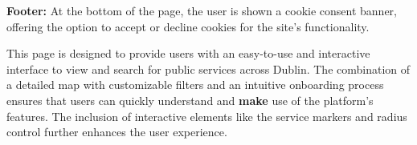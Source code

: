 \textbf{Footer:} At the bottom of the page, the user is shown a cookie consent banner, offering the option to accept or decline cookies for the site’s functionality.

This page is designed to provide users with an easy{-}to{-}use and interactive interface to view and search for public services across Dublin. The combination of a detailed map with customizable filters and an intuitive onboarding process ensures that users can quickly understand and \textbf{make} use of the platform’s features. The inclusion of interactive elements like the service markers and radius control further enhances the user experience.


\paragraph{}